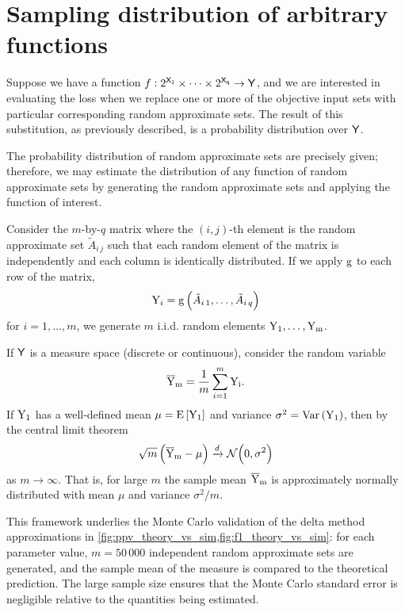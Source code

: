 \section{Sampling distribution of arbitrary functions}
\label{app:samp}
Suppose we have a function $f : \PS{\Set{X}[1]} \times \cdots \times \PS{\Set{X}[q]} \to \Set{Y}$, and we are interested in evaluating the loss when we replace one or more of the objective input sets with particular corresponding random approximate sets.
The result of this substitution, as previously described, is a probability distribution over $\Set{Y}$.

The probability distribution of random approximate sets are precisely given; therefore, we may estimate the distribution of any function of random approximate sets by generating the random approximate sets and applying the function of interest.

Consider the $m$-by-$q$ matrix where the $(i,j)$-th element is the random approximate set $\tilde{A}_{i\,j}$ such that each random element of the matrix is independently and each column is identically distributed.
If we apply $\Fun{g}$ to each row of the matrix,
\begin{equation}
\RV{Y}_i = \Fun{g}\left(\tilde{A}_{i\,1},\ldots,\tilde{A}_{i\,q}\right)
\end{equation}
for $i=1,\ldots,m$, we generate $m$ i.i.d. random elements $\mathrm{Y_1},\ldots,\mathrm{Y_m}$.

If $\Set{Y}$ is a measure space (discrete or continuous), consider the random variable
\begin{equation}
\mathrm{\overline{Y}_m} = \frac{1}{m} \sum_{i=1}^m \mathrm{Y_i}.
\end{equation}
If $\mathrm{Y_1}$ has a well-defined mean $\mu = \Expect{\RV{Y_1}}$ and variance $\sigma^2 = \Var{\RV{Y_1}}$, then by the central limit theorem
\begin{equation}
\sqrt{m}\left(\mathrm{\overline{Y}_m} - \mu\right) \xrightarrow{d} \mathcal{N}\!\left(0, \sigma^2\right)
\end{equation}
as $m \to \infty$.
That is, for large $m$ the sample mean $\mathrm{\overline{Y}_m}$ is approximately normally distributed with mean $\mu$ and variance $\sigma^2 / m$.

This framework underlies the Monte Carlo validation of the delta method approximations in \cref{fig:ppv_theory_vs_sim,fig:f1_theory_vs_sim}: for each parameter value, $m = 50\,000$ independent random approximate sets are generated, and the sample mean of the measure is compared to the theoretical prediction.
The large sample size ensures that the Monte Carlo standard error is negligible relative to the quantities being estimated.
